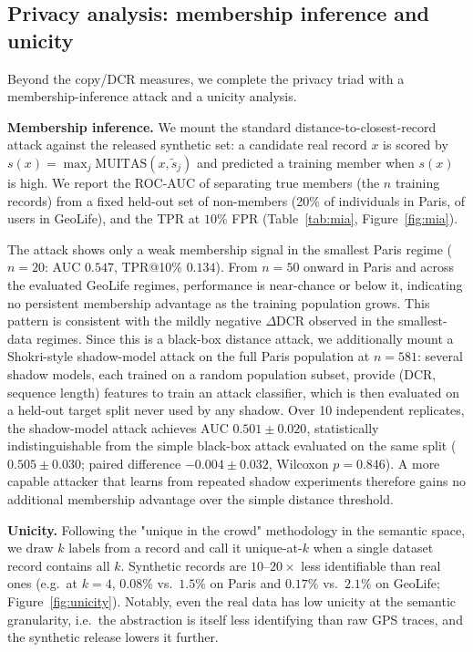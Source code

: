 \documentclass[sigconf,nonacm]{acmart}
\begin{document}
\subsection{Privacy analysis: membership inference and unicity}
\label{sec:privacy-attacks}
Beyond the copy/DCR measures, we complete the privacy triad with a membership-inference attack and a
unicity analysis. 


\textbf{Membership inference.} We mount the standard distance-to-closest-record attack against the released synthetic set: a candidate real record $x$ is scored by
$s(x)=\max_j \mathrm{MUITAS}(x,\tilde s_j)$ and predicted a training member when $s(x)$ is high. We
report the ROC-AUC of separating true members (the $n$ training records) from a fixed held-out set of
non-members (20\% of individuals in Paris, of users in GeoLife), and the TPR at $10\%$ FPR
(Table~\ref{tab:mia}, Figure~\ref{fig:mia}). 

The attack shows only a weak membership signal in the smallest Paris regime ($n{=}20$: AUC $0.547$, TPR@10\% $0.134$). From $n{=}50$ onward in Paris and across the evaluated GeoLife regimes, performance is near-chance or below it, indicating no persistent membership advantage as the training population grows. This pattern is consistent with the mildly negative $\Delta$DCR observed in the smallest-data regimes. Since this is a black-box distance attack, we additionally mount a Shokri-style shadow-model attack on the full Paris population at $n{=}581$: several shadow models, each trained on a random population subset, provide (DCR, sequence length) features to train an attack classifier, which is then evaluated on a held-out target split never used by any shadow. Over 10 independent replicates, the shadow-model attack achieves AUC $0.501\pm0.020$, statistically indistinguishable from the simple black-box attack evaluated on the same split ($0.505\pm0.030$; paired difference $-0.004\pm0.032$, Wilcoxon $p=0.846$). A more capable attacker that learns from repeated shadow experiments therefore gains no additional membership advantage over the simple distance threshold.

\textbf{Unicity.} Following the "unique in the crowd" methodology in the semantic
space, we draw $k$ labels from a record and call it unique-at-$k$ when a single dataset record contains
all $k$. Synthetic records are $10$--$20\times$ less identifiable than real ones (e.g.\ at $k{=}4$,
$0.08\%$ vs.\ $1.5\%$ on Paris and $0.17\%$ vs.\ $2.1\%$ on GeoLife; Figure~\ref{fig:unicity}). Notably,
even the real data has low unicity at the semantic granularity, i.e.\ the abstraction is itself less
identifying than raw GPS traces, and the synthetic release lowers it further.
\end{document}
